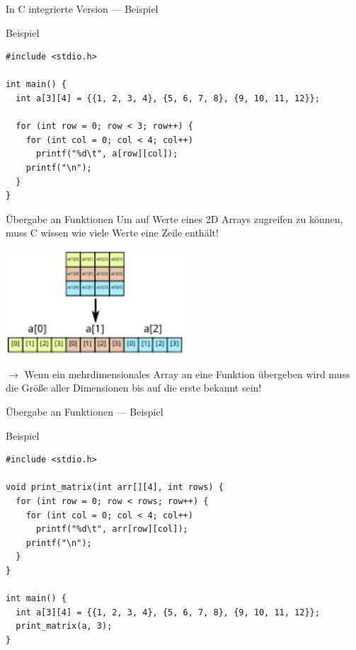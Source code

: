 \documentclass[presentation]{beamer}
\begin{document}
\begin{frame}[label={sec:org5b85d90},fragile]{In C integrierte Version --- Beispiel}
 \begin{block}{Beispiel}
\begin{verbatim}
#include <stdio.h>

int main() {
  int a[3][4] = {{1, 2, 3, 4}, {5, 6, 7, 8}, {9, 10, 11, 12}};

  for (int row = 0; row < 3; row++) {
    for (int col = 0; col < 4; col++)
      printf("%d\t", a[row][col]);
    printf("\n");
  }
}
\end{verbatim}
\end{block}
\end{frame}

\begin{frame}[label={sec:orgac48ce4}]{Übergabe an Funktionen}
Um auf Werte eines 2D Arrays zugreifen zu können, muss C wissen wie
viele Werte eine Zeile enthält!
\begin{center}\begin{center}
\includegraphics[width=0.5\textwidth]{2dto1d.pdf}
\end{center}\end{center} 

\(\rightarrow\) Wenn ein mehrdimensionales Array \alert{an eine Funktion
übergeben} wird muss die Größe aller Dimensionen bis auf die erste
\alert{bekannt} sein!
\end{frame}
\begin{frame}[label={sec:orgb4f8eca},fragile]{Übergabe an Funktionen --- Beispiel}
 \begin{block}{Beispiel}
\begin{verbatim}
#include <stdio.h>

void print_matrix(int arr[][4], int rows) {
  for (int row = 0; row < rows; row++) {
    for (int col = 0; col < 4; col++)
      printf("%d\t", arr[row][col]);
    printf("\n");
  }
}

int main() {
  int a[3][4] = {{1, 2, 3, 4}, {5, 6, 7, 8}, {9, 10, 11, 12}};
  print_matrix(a, 3);
}
\end{verbatim}
\end{block}
\end{frame}
\end{document}
